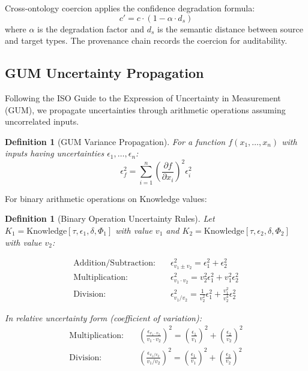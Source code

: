\documentclass{article}
\newtheorem{definition}[theorem]{Definition}
\begin{document}
Cross-ontology coercion applies the confidence degradation formula:
\[
c' = c \cdot (1 - \alpha \cdot d_s)
\]
where $\alpha$ is the degradation factor and $d_s$ is the semantic distance
between source and target types. The provenance chain records the coercion
for auditability.

\subsection{GUM Uncertainty Propagation}

Following the ISO Guide to the Expression of Uncertainty in Measurement (GUM),
we propagate uncertainties through arithmetic operations assuming uncorrelated inputs.

\begin{definition}[GUM Variance Propagation]
For a function $f(x_1, \ldots, x_n)$ with inputs having uncertainties $\epsilon_1, \ldots, \epsilon_n$:
\[
\epsilon_f^2 = \sum_{i=1}^{n} \left( \frac{\partial f}{\partial x_i} \right)^2 \epsilon_i^2
\]
\end{definition}

For binary arithmetic operations on Knowledge values:

\begin{definition}[Binary Operation Uncertainty Rules]
Let $K_1 = \text{Knowledge}[\tau, \epsilon_1, \delta, \Phi_1]$ with value $v_1$ and
$K_2 = \text{Knowledge}[\tau, \epsilon_2, \delta, \Phi_2]$ with value $v_2$:

\begin{align*}
\text{Addition/Subtraction:} \quad & \epsilon_{v_1 \pm v_2}^2 = \epsilon_1^2 + \epsilon_2^2 \\[0.5em]
\text{Multiplication:} \quad & \epsilon_{v_1 \cdot v_2}^2 = v_2^2 \epsilon_1^2 + v_1^2 \epsilon_2^2 \\[0.5em]
\text{Division:} \quad & \epsilon_{v_1 / v_2}^2 = \frac{1}{v_2^2} \epsilon_1^2 + \frac{v_1^2}{v_2^4} \epsilon_2^2
\end{align*}

In relative uncertainty form (coefficient of variation):
\begin{align*}
\text{Multiplication:} \quad & \left(\frac{\epsilon_{v_1 \cdot v_2}}{v_1 \cdot v_2}\right)^2 = \left(\frac{\epsilon_1}{v_1}\right)^2 + \left(\frac{\epsilon_2}{v_2}\right)^2 \\[0.5em]
\text{Division:} \quad & \left(\frac{\epsilon_{v_1 / v_2}}{v_1 / v_2}\right)^2 = \left(\frac{\epsilon_1}{v_1}\right)^2 + \left(\frac{\epsilon_2}{v_2}\right)^2
\end{align*}
\end{definition}
\end{document}
